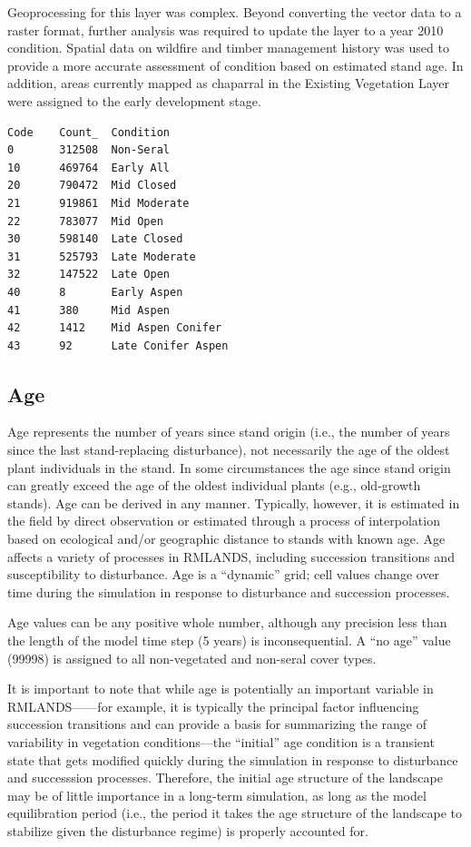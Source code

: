 Geoprocessing for this layer was complex. Beyond converting the vector data to a raster format, further analysis was required to update the layer to a year 2010 condition. Spatial data on wildfire and timber management history was used to provide a more accurate assessment of condition based on estimated stand age. In addition, areas currently mapped as chaparral in the Existing Vegetation Layer were assigned to the early development stage.

\begin{verbatim}
Code	Count_	Condition
0		312508	Non-Seral
10		469764	Early All
20		790472	Mid Closed
21		919861	Mid Moderate
22		783077	Mid Open
30		598140	Late Closed
31		525793	Late Moderate
32		147522	Late Open
40		8		Early Aspen
41		380		Mid Aspen
42		1412	Mid Aspen Conifer
43		92		Late Conifer Aspen
\end{verbatim}

\subsection{Age}
Age represents the number of years since stand origin (i.e., the number of years since the last
stand-replacing disturbance), not necessarily the age of the oldest plant individuals in the stand. In some circumstances the age since stand origin can greatly exceed the age of the oldest individual plants (e.g., old-growth stands). Age can be derived in any manner. Typically, however, it is estimated in the field by direct observation or estimated through a process of interpolation based on ecological and/or geographic distance to stands with known age. Age affects a variety of processes in RMLANDS, including succession transitions and susceptibility to disturbance. Age is a ``dynamic'' grid; cell values change over time during the simulation in response to disturbance and succession processes.

Age values can be any positive whole number, although any precision less than the length of the model time step (5 years) is inconsequential. A “no age” value (99998) is assigned to all non-vegetated and non-seral cover types.

It is important to note that while age is potentially an important variable in RMLANDS——for example, it is typically the principal factor influencing succession transitions and can provide a basis for summarizing the range of variability in vegetation conditions––the ``initial'' age condition is a transient state that gets modified quickly during the simulation in response to disturbance and successsion processes. Therefore, the initial age structure of the landscape may be of little importance in a long-term simulation, as long as the model equilibration period (i.e., the period it takes the age structure of the landscape to stabilize given the disturbance regime) is properly accounted for.

